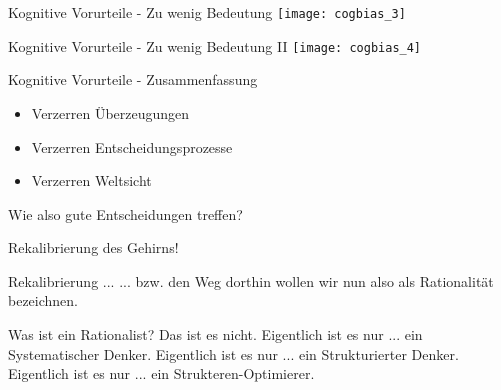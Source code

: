 \begin{frame}[c]{Kognitive Vorurteile - Zu wenig Bedeutung}
    \centering
    \texttt{[image: cogbias\_3]}
\end{frame}

\begin{frame}[c]{Kognitive Vorurteile - Zu wenig Bedeutung II}
    \centering
    \texttt{[image: cogbias\_4]}
\end{frame}





\begin{frame}[c]{Kognitive Vorurteile - Zusammenfassung}
    \begin{itemize}
        \item Verzerren Überzeugungen
        \pause
        \item Verzerren Entscheidungsprozesse
        \pause
        \item Verzerren Weltsicht \newline
        \pause
    \end{itemize}
    Wie also gute Entscheidungen treffen? \newline \pause
\end{frame}


\begin{frame}[standout]
    Rekalibrierung des Gehirns!
\end{frame}


\begin{frame}[c]{Rekalibrierung ...}
    $...$ bzw. den Weg dorthin wollen wir nun also als Rationalität bezeichnen.
\end{frame}


\begin{frame}[c]{Was ist ein Rationalist?}
    Das ist es nicht. \newline
    Eigentlich ist es nur $...$ ein Systematischer Denker.
    Eigentlich ist es nur $...$ ein Strukturierter Denker.
    Eigentlich ist es nur $...$ ein Strukteren-Optimierer.
\end{frame}


